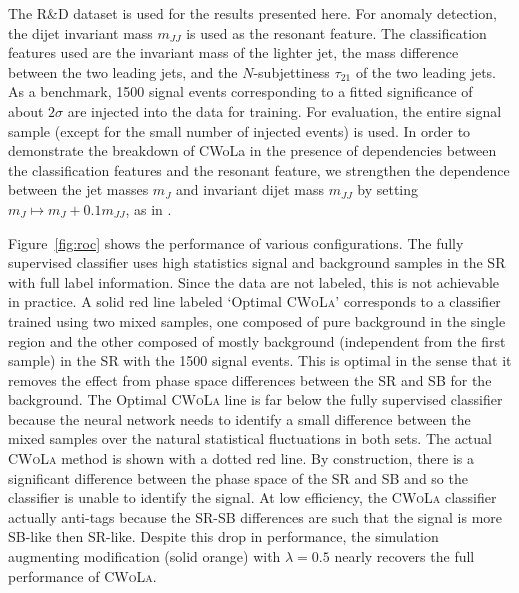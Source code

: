 \documentclass[a4paper,11pt]{article}
\begin{document}
The R\&D dataset is used for the results presented here.  For anomaly detection, the dijet invariant mass $m_{JJ}$ is used as the resonant feature. The classification features used are the invariant mass of the lighter jet, the mass difference between the two leading jets, and the $N$-subjettiness $\tau_{21}$ of the two leading jets.  As a benchmark, 1500 signal events corresponding to a fitted significance of about $2\sigma$ are injected into the data for training.  For evaluation, the entire signal sample (except for the small number of injected events) is used.  In order to demonstrate the breakdown of CWoLa in the presence of dependencies between the classification features and the resonant feature, we strengthen the dependence between the jet masses $m_J$ and invariant dijet mass $m_{JJ}$ by setting $m_J \mapsto m_J + 0.1 m_{JJ}$, as in \cite{Nachman:2020lpy}.

Figure~\ref{fig:roc} shows the performance of various configurations.    The fully supervised classifier uses high statistics signal and background samples in the SR with full label information.  Since the data are not labeled, this is not achievable in practice.  A solid red line labeled `Optimal \textsc{CWoLa}' corresponds to a classifier trained using two mixed samples, one composed of pure background in the single region and the other composed of mostly background (independent from the first sample) in the SR with the 1500 signal events.  This is optimal in the sense that it removes the effect from phase space differences between the SR and SB for the background.  The Optimal \textsc{CWoLa} line is far below the fully supervised classifier because the neural network needs to identify a small difference between the mixed samples over the natural statistical fluctuations in both sets.  The actual \textsc{CWoLa} method is shown with a dotted red line.  By construction, there is a significant difference between the phase space of the SR and SB and so the classifier is unable to identify the signal.  At low efficiency, the \textsc{CWoLa} classifier actually anti-tags because the SR-SB differences are such that the signal is more SB-like then SR-like.  Despite this drop in performance, the simulation augmenting modification (solid orange) with $\lambda=0.5$ nearly recovers the full performance of \textsc{CWoLa}.  
\end{document}
